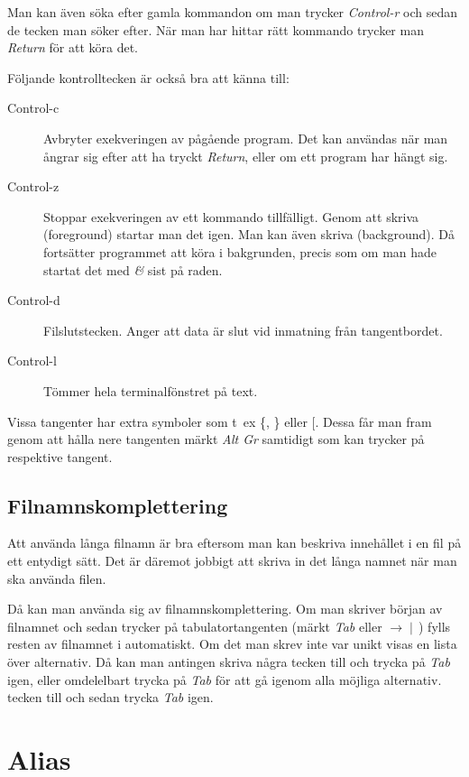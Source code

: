 \documentclass[a4paper,twocolumn]{book}
\begin{document}
Man kan även söka efter gamla kommandon om man trycker \emph{Control-r} och
sedan de tecken man söker efter. När man har hittar rätt kommando trycker man
\emph{Return} för att köra det.

Följande kontrolltecken är också bra att känna till:
\begin{description}
\item[Control-c] Avbryter exekveringen av pågående program. Det kan
  användas när man ångrar sig efter att ha tryckt \emph{Return}, eller
  om ett program har hängt sig.
\item[Control-z] Stoppar exekveringen av ett kommando
  tillfälligt. Genom att skriva  (foreground) startar man
  det igen. Man kan även skriva  (background). Då
  fortsätter programmet att köra i bakgrunden, precis som om man hade
  startat det med \emph{\&} sist på raden.
\item[Control-d] Filslutstecken. Anger att data är slut vid inmatning
  från tangentbordet.
\item[Control-l] Tömmer hela terminalfönstret på text.
\end{description}

Vissa tangenter har extra symboler som t~ex \{, \} eller [. Dessa får
man fram genom att hålla nere tangenten märkt \emph{Alt Gr}
samtidigt som kan trycker på respektive tangent.

\subsection{Filnamnskomplettering}

Att använda långa filnamn är bra eftersom
man kan beskriva innehållet i en fil på ett entydigt sätt. Det är
däremot jobbigt att skriva in det långa namnet när man ska använda
filen.

Då kan man använda sig av filnamnskomplettering. Om man skriver början
av filnamnet och sedan trycker på tabulatortangenten (märkt \emph{Tab}
eller $\rightarrow\!\mid\,$) fylls resten av filnamnet i automatiskt. Om
det man skrev inte var unikt visas en lista över alternativ. Då kan man
antingen skriva några tecken till och trycka på \emph{Tab} igen, eller
omdelelbart trycka på \emph{Tab} för att gå igenom alla möjliga alternativ.
tecken till och sedan trycka \emph{Tab} igen.

\section{Alias}
\end{document}
